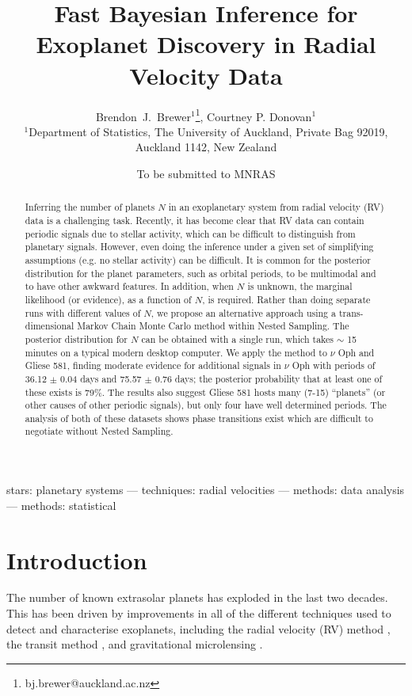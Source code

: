 \documentclass[useAMS,usenatbib]{mn2e}
\title[]
{Fast Bayesian Inference for Exoplanet Discovery in Radial Velocity Data}
\author[Brewer and Donovan]{%
  Brendon~J.~Brewer$^{1}$\thanks{bj.brewer@auckland.ac.nz},
  Courtney P. Donovan$^{1}$
  \medskip\\
  $^1$Department of Statistics, The University of Auckland, Private Bag 92019, Auckland 1142, New Zealand}
\begin{document}
             
\date{To be submitted to MNRAS}
             
\maketitle

\label{firstpage}


\begin{abstract}
Inferring the number of planets $N$ in an exoplanetary system from radial velocity
(RV) data is a challenging task. Recently, it has become clear that RV data
can contain periodic signals due to stellar activity, which can be difficult
to distinguish from planetary signals. However, even doing the inference
under a given set of simplifying assumptions (e.g. no stellar activity) can
be difficult. It is common for the posterior distribution for the
planet parameters, such as orbital periods,
to be multimodal and to have other awkward features. In
addition, when $N$ is unknown, the marginal likelihood (or evidence), as a
function of $N$, is required. Rather than doing separate runs with different
values of $N$, we propose an alternative
approach using a trans-dimensional Markov Chain Monte Carlo method within
Nested Sampling. The posterior distribution for $N$ can be obtained with a
single run, which takes $\sim$ 15 minutes on a typical modern desktop computer.
We apply the method to $\nu$ Oph and Gliese 581, finding moderate evidence
for additional signals in
$\nu$ Oph with periods of 36.12 $\pm$ 0.04 days and
75.57 $\pm$ 0.76 days; the posterior probability that at least one of these
exists is 79\%. The results also suggest Gliese 581 hosts many (7-15) ``planets''
(or other causes of other periodic
signals), but only four have well determined periods. The analysis of both
of these datasets shows phase transitions exist which are difficult to
negotiate without Nested Sampling.
\end{abstract}

\begin{keywords}
stars: planetary systems --- techniques: radial velocities ---
methods: data analysis --- methods: statistical
\end{keywords}


\section{Introduction}
The number of known extrasolar planets has exploded in the last two
decades. This has been driven by improvements in
all of the different techniques used to detect and characterise exoplanets,
including the radial velocity (RV) method \citep[e.g.][]{2012PASJ...64..135S},
the transit method \citep[e.g.]{2014PNAS..11112647B},
and gravitational microlensing
\citep[e.g.][]{2014ApJ...785..155B, 2014ApJ...790...14Y}.
\end{document}
